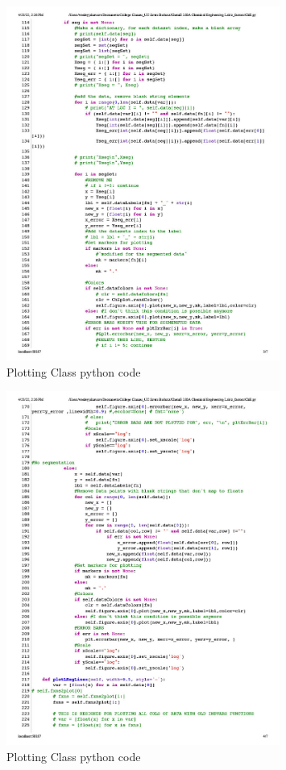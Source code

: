 \documentclass{article}
\begin{document}
\begin{figure}[H] \centering
\includegraphics[width=0.8\textwidth]{code/che_py1024_3.jpg}
\caption{\label{fig1}Plotting Class python code}\end{figure}


\begin{figure}[H] \centering
\includegraphics[width=0.8\textwidth]{code/che_py1024_4.jpg}
\caption{\label{fig1}Plotting Class python code}\end{figure}
\end{document}
